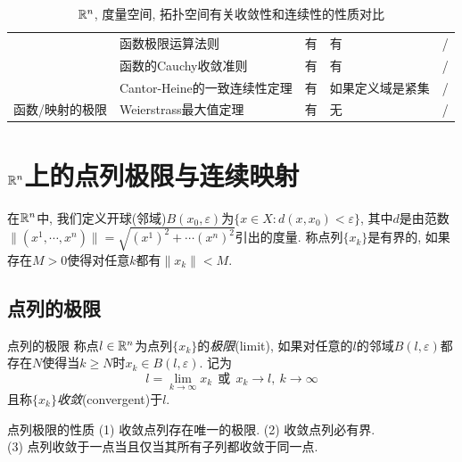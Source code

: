 \begin{table}[h]
\begin{tabular}{|l|l|p{2cm}|l|p{2cm}|}
{ }                             & { 函数极限运算法则}              & { 有}                                              & { 有}         & /                \\
{ }                             & { 函数的Cauchy收敛准则}         & { 有}                                              & { 有}         & /                \\
{ }                             & { Cantor-Heine的一致连续性定理}  & { 有}                                              & { 如果定义域是紧集}  & /                \\
\multirow{-5}{*}{{ 函数/映射的极限}}   & Weierstrass最大值定理                             & 有                                                                     & 无                                & /  \\ \hline              
\end{tabular}
\caption{$\mathbb{R} ^n$, 度量空间, 拓扑空间有关收敛性和连续性的性质对比}
\end{table}

\section{$\mathbb{R} ^n$上的点列极限与连续映射}

在$\mathbb{R} ^n$中, 我们定义开球(邻域)$B(x_0,\varepsilon)$为$\{ x \in X:d(x,x_0)<\varepsilon \}$, 其中$d$是由范数$\| (x^1,\cdots ,x^n) \| = \sqrt{(x^1)^2+\cdots (x^n)^2}$引出的度量. 称点列$\{ x_k \}$是有界的, 如果存在$M>0$使得对任意$k$都有$\| x_k \|<M$. 

\subsection{点列的极限}

\begin{definition}{点列的极限}
	称点$l \in \mathbb{R} ^n$为点列$\{ x_k \}$的\textit{极限}(limit), 如果对任意的$l$的邻域$B(l,\varepsilon)$都存在$N$使得当$k \geq N$时$x_k \in B(l,\varepsilon)$. 记为$$l = \lim_{k \to \infty} x_k ~~ \text{或} ~~ x_k \to l,~k \to \infty$$且称$\{ x_k \}$\textit{收敛}(convergent)于$l$. 
\end{definition}

\begin{proposition}{点列极限的性质}
	(1) 收敛点列存在唯一的极限. \qquad (2) 收敛点列必有界. \\
	(3) 点列收敛于一点当且仅当其所有子列都收敛于同一点. 
\end{proposition}

